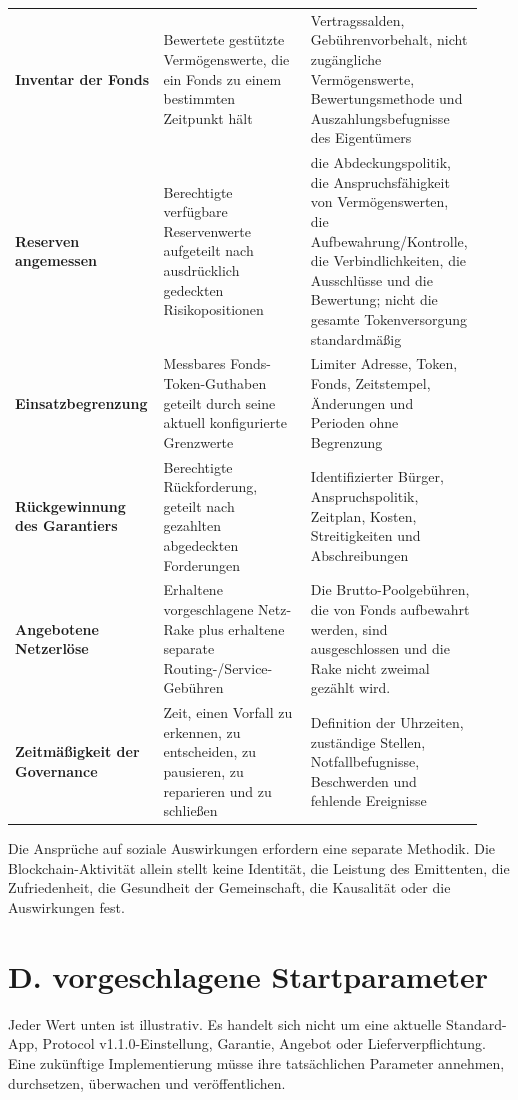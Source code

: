 \documentclass[11pt]{article}
\begin{document}
\begin{longtable}{P{0.31\linewidth} P{0.31\linewidth} P{0.31\linewidth}}
\textbf{Inventar der Fonds} & Bewertete gestützte Vermögenswerte, die ein Fonds zu einem bestimmten Zeitpunkt hält & Vertragssalden, Gebührenvorbehalt, nicht zugängliche Vermögenswerte, Bewertungsmethode und Auszahlungsbefugnisse des Eigentümers \\
\textbf{Reserven angemessen} & Berechtigte verfügbare Reservenwerte aufgeteilt nach ausdrücklich gedeckten Risikopositionen & die Abdeckungspolitik, die Anspruchsfähigkeit von Vermögenswerten, die Aufbewahrung/Kontrolle, die Verbindlichkeiten, die Ausschlüsse und die Bewertung; nicht die gesamte Tokenversorgung standardmäßig \\
\textbf{Einsatzbegrenzung} & Messbares Fonds-Token-Guthaben geteilt durch seine aktuell konfigurierte Grenzwerte & Limiter Adresse, Token, Fonds, Zeitstempel, Änderungen und Perioden ohne Begrenzung \\
\textbf{Rückgewinnung des Garantiers} & Berechtigte Rückforderung, geteilt nach gezahlten abgedeckten Forderungen & Identifizierter Bürger, Anspruchspolitik, Zeitplan, Kosten, Streitigkeiten und Abschreibungen \\
\textbf{Angebotene Netzerlöse} & Erhaltene vorgeschlagene Netz-Rake plus erhaltene separate Routing-/Service-Gebühren & Die Brutto-Poolgebühren, die von Fonds aufbewahrt werden, sind ausgeschlossen und die Rake nicht zweimal gezählt wird. \\
\textbf{Zeitmäßigkeit der Governance} & Zeit, einen Vorfall zu erkennen, zu entscheiden, zu pausieren, zu reparieren und zu schließen & Definition der Uhrzeiten, zuständige Stellen, Notfallbefugnisse, Beschwerden und fehlende Ereignisse \\
\bottomrule
\end{longtable}

Die Ansprüche auf soziale Auswirkungen erfordern eine separate Methodik. Die Blockchain-Aktivität allein stellt keine Identität, die Leistung des Emittenten, die Zufriedenheit, die Gesundheit der Gemeinschaft, die Kausalität oder die Auswirkungen fest.


\section*{D. vorgeschlagene Startparameter}

Jeder Wert unten ist illustrativ. Es handelt sich nicht um eine aktuelle Standard-App, Protocol v1.1.0-Einstellung, Garantie, Angebot oder Lieferverpflichtung. Eine zukünftige Implementierung müsse ihre tatsächlichen Parameter annehmen, durchsetzen, überwachen und veröffentlichen.
\end{document}
